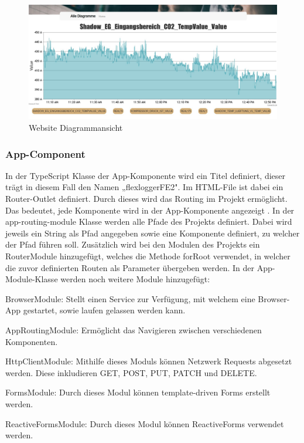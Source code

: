 \begin{figure}
\centering
\includegraphics[scale=0.35]{pics/FlexLoggerWebsiteDiagramm.jpg}
\caption{Website Diagrammansicht}
\label{fig:impl:FlexLoggerDiagrammAnsicht}
\end{figure}


\subsubsection{App-Component}
In der TypeScript Klasse der App-Komponente wird ein Titel definiert, dieser trägt in diesem Fall den Namen „flexloggerFE2". Im HTML-File ist dabei ein Router-Outlet definiert. Durch dieses wird das Routing im Projekt ermöglicht. Das bedeutet, jede Komponente wird in der App-Komponente angezeigt %
. In der app-routing-module Klasse werden alle Pfade des Projekts definiert. Dabei wird jeweils ein String als Pfad angegeben sowie eine Komponente definiert, zu welcher der Pfad führen soll. Zusätzlich wird bei den Modulen des Projekts ein RouterModule hinzugefügt, welches die Methode forRoot verwendet, in welcher die zuvor definierten Routen als Parameter übergeben werden. In der App-Module-Klasse werden noch weitere Module hinzugefügt:


\begin{compactitem}
\item BrowserModule: Stellt einen Service zur Verfügung, mit welchem eine Browser-App gestartet, sowie laufen gelassen werden kann.
\item AppRoutingModule: Ermöglicht das Navigieren zwischen verschiedenen Komponenten.
\item HttpClientModule: Mithilfe dieses Moduls können Netzwerk Requests abgesetzt werden. Diese inkludieren GET, POST, PUT, PATCH und DELETE.
\item FormsModule: Durch dieses Modul können template-driven Forms erstellt werden.
\item ReactiveFormsModule: Durch dieses Modul können ReactiveForms verwendet werden.
\end{compactitem}



